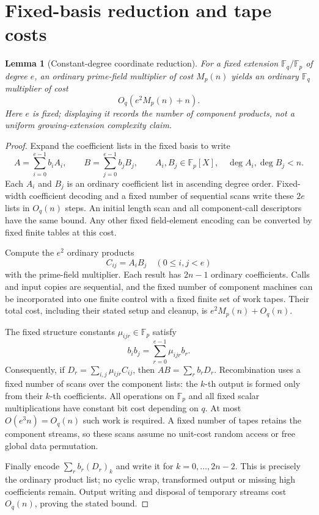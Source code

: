 \documentclass[11pt]{article}
\newtheorem{lemma}{Lemma}
\newcommand{\F}{\mathbb F}
\begin{document}
\section{Fixed-basis reduction and tape costs}
\begin{lemma}[Constant-degree coordinate reduction]
\label{lem:extension}
For a fixed extension $\F_q/\F_p$ of degree $e$, an ordinary
prime-field multiplier of cost $M_p(n)$ yields an ordinary
$\F_q$ multiplier of cost
\[
 O_q\!\left(e^2 M_p(n)+n\right).
\]
Here $e$ is fixed; displaying it records the number of component
products, not a uniform growing-extension complexity claim.
\end{lemma}
\begin{proof}
Expand the coefficient lists in the fixed basis to write
\[
 A=\sum_{i=0}^{e-1} b_i A_i,\qquad
 B=\sum_{j=0}^{e-1} b_j B_j,
 \qquad A_i,B_j\in\F_p[X],\quad \deg A_i,\deg B_j<n.
\]
Each $A_i$ and $B_j$ is an ordinary coefficient list in ascending
degree order. Fixed-width coefficient decoding and a fixed number
of sequential scans write these $2e$ lists in $O_q(n)$ steps.
An initial length scan and all component-call descriptors have the
same bound. Any other fixed field-element encoding can be converted
by fixed finite tables at this cost.

Compute the $e^2$ ordinary products
\[
 C_{ij}=A_iB_j\quad(0\le i,j<e)
\]
with the prime-field multiplier. Each result has $2n-1$ ordinary
coefficients. Calls and input copies are sequential, and the fixed
number of component machines can be incorporated into one finite
control with a fixed finite set of work tapes. Their total cost,
including their stated setup and cleanup, is
$e^2M_p(n)+O_q(n)$.

The fixed structure constants $\mu_{ijr}\in\F_p$ satisfy
\[
 b_i b_j=\sum_{r=0}^{e-1}\mu_{ijr}b_r.
\]
Consequently, if $D_r=\sum_{i,j}\mu_{ijr}C_{ij}$, then
$AB=\sum_r b_rD_r$. Recombination uses a fixed number of scans
over the component lists: the $k$-th output is formed only from
their $k$-th coefficients. All operations on $\F_p$ and all fixed
scalar multiplications have constant bit cost depending on $q$.
At most $O(e^3n)=O_q(n)$ such work is required. A fixed number
of tapes retains the component streams, so these scans assume no
unit-cost random access or free global data permutation.

Finally encode $\sum_r b_r(D_r)_k$ and write it for
$k=0,\ldots,2n-2$. This is precisely the ordinary product list;
no cyclic wrap, transformed output or missing high coefficients
remain. Output writing and disposal of temporary streams cost
$O_q(n)$, proving the stated bound.
\end{proof}
\end{document}
